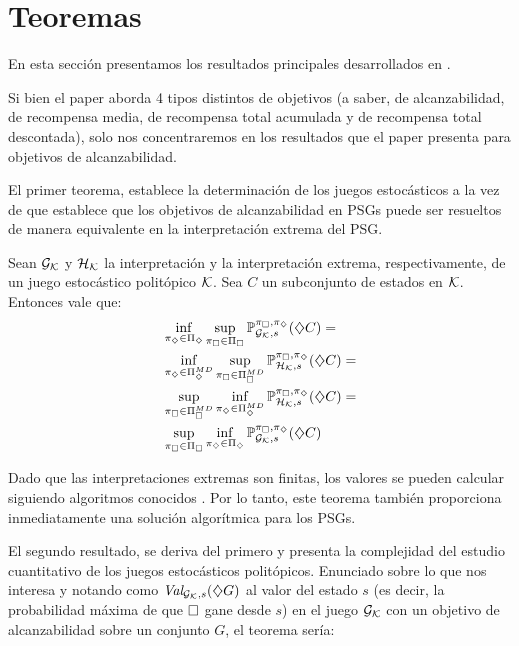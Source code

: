 
\section{Teoremas}

En esta sección presentamos los resultados principales desarrollados en
\cite{Polytopal}.

Si bien el paper aborda 4 tipos distintos de objetivos (a saber, de
alcanzabilidad, de recompensa media, de recompensa total acumulada y de
recompensa total descontada), solo nos concentraremos en los resultados que el
paper presenta para objetivos de alcanzabilidad.

El primer teorema, establece la determinación de los juegos estocásticos a la
vez de que establece que los objetivos de alcanzabilidad en PSGs puede ser
resueltos de manera equivalente en la interpretación extrema del PSG.

\begin{theorem}
	Sean $\mathcal{G}_{\mathcal{K}}$ y $\mathcal{H}_{\mathcal{K}}$ la interpretación y la interpretación extrema, respectivamente, de un juego estocástico politópico $\mathcal{K}$. Sea $C$ un subconjunto de estados en $\mathcal{K}$. Entonces vale que:
	\begin{align*}
		&\inf_{\pi_\diamondsuit \in \Pi_\diamondsuit} \sup_{\pi_\square \in \Pi_\square} \mathbb{P}_{\mathcal{G}_{\mathcal{K}}, s}^{\pi_\square, \pi_\diamondsuit}(\diamondsuit C) = \\
		&\inf_{\pi_\diamondsuit \in \Pi_\diamondsuit^{MD}} \sup_{\pi_\square \in \Pi_\square^{MD}} \mathbb{P}_{\mathcal{H}_{\mathcal{K}}, s}^{\pi_\square, \pi_\diamondsuit}(\diamondsuit C) = \\
		&\sup_{\pi_\square \in \Pi_\square^{MD}} \inf_{\pi_\diamondsuit \in \Pi_\diamondsuit^{MD}} \mathbb{P}_{\mathcal{H}_{\mathcal{K}}, s}^{\pi_\square, \pi_\diamondsuit}(\diamondsuit C) = \\
		&\sup_{\pi_\square \in \Pi_\square} \inf_{\pi_\diamondsuit \in \Pi_\diamondsuit} \mathbb{P}_{\mathcal{G}_{\mathcal{K}}, s}^{\pi_\square, \pi_\diamondsuit}(\diamondsuit C)
	\end{align*}
\end{theorem}

Dado que las interpretaciones extremas son finitas, los valores se pueden
calcular siguiendo algoritmos conocidos \cite{CONDON1992,filar}. Por lo tanto,
este teorema también proporciona inmediatamente una solución algorítmica para
los PSGs.

El segundo resultado, se deriva del primero y presenta la complejidad del
estudio cuantitativo de los juegos estocásticos politópicos. Enunciado sobre lo
que nos interesa y notando como $\textit{Val}_{\mathcal{G}_{\mathcal{K}},s}(\diamondsuit G)$ al valor del estado $s$
(es decir, la probabilidad máxima de que $\square$ gane desde $s$) en el juego
$\mathcal{G}_{\mathcal{K}}$ con un objetivo de alcanzabilidad sobre un conjunto $G$, el teorema
sería:

